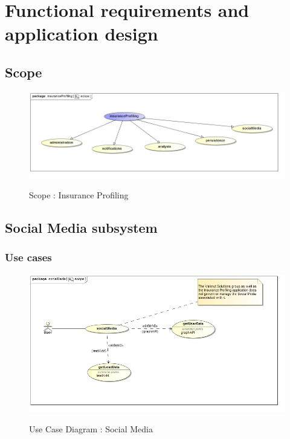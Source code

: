 \documentclass{article}
\begin{document}
\section{Functional requirements and application design}
	\subsection{Scope}
		\begin{figure}[H]
		\includegraphics[width=\textwidth]{images/uc__insuranceProfiling__scope.jpg}  \\
		\caption{Scope : Insurance Profiling}
		\end{figure}
	\subsection{Social Media subsystem}
		\subsubsection{Use cases}

		\begin{figure}[H]
		\includegraphics[width=\textwidth]{images/uc__socialMedia__scope.jpg}  \\
		\caption{Use Case Diagram : Social Media}
		\end{figure}
\end{document}
